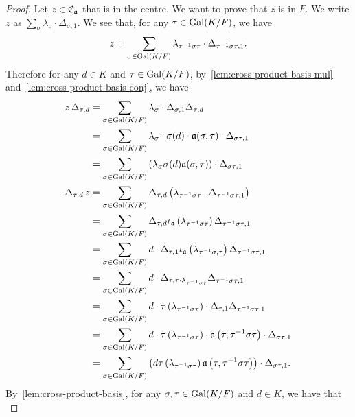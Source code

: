\begin{proof}
  Let $z \in \operatorname{\mathfrak{C}}_{\mathfrak{a}}$ that is in the centre. We want to prove that $z$ is in $F$. We write $z$ as $\sum_{\sigma}\lambda_{\sigma}\cdot\Delta_{\sigma,1}$. We see that, for any $\tau \in \operatorname{Gal}(K/F)$, we have
  \[
    z = \sum_{\sigma\in\operatorname{Gal}(K/F)} \lambda_{\tau^{-1}\sigma\tau}\cdot\Delta_{\tau^{-1}\sigma\tau,1}.
  \]
  Therefore for any $d \in K$ and $\tau\in\operatorname{Gal}(K/F)$, by~\cref{lem:cross-product-basis-mul} and~\cref{lem:cross-product-basis-conj}, we have
  \[
    \begin{aligned}
      z\, \Delta_{\tau,d}
      &= \sum_{\sigma\in\operatorname{Gal}(K/F)}\lambda_{\sigma}\cdot\Delta_{\sigma, 1}\Delta_{\tau,d}\\
      &= \sum_{\sigma\in\operatorname{Gal}(K/F)}\lambda_{\sigma}\cdot\sigma(d)\cdot \mathfrak{a}(\sigma,\tau) \cdot \Delta_{\sigma\tau, 1}\\
      &= \sum_{\sigma\in\operatorname{Gal}(K/F)}\left(\lambda_{\sigma}\sigma(d)\mathfrak{a}(\sigma,\tau)\right)\cdot \Delta_{\sigma\tau,1}\\
      \Delta_{\tau,d}\, z
      &= \sum_{\sigma\in\operatorname{Gal}(K/F)}\Delta_{\tau,d}\left(\lambda_{\tau^{-1}\sigma\tau}\cdot \Delta_{\tau^{-1}\sigma\tau, 1}\right)\\
      &= \sum_{\sigma\in\operatorname{Gal}(K/F)}\Delta_{\tau,d}\iota_{\mathfrak{a}}\left(\lambda_{\tau^{-1}\sigma\tau}\right)\Delta_{\tau^{-1}\sigma\tau, 1} \\
      &=\sum_{\sigma\in\operatorname{Gal}(K/F)} d \cdot \Delta_{\tau, 1}\iota_{\mathfrak{a}}\left(\lambda_{\tau^{-1}\sigma, \tau}\right)\Delta_{\tau^{-1}\sigma\tau, 1}\\
      &=\sum_{\sigma\in\operatorname{Gal}(K/F)} d \cdot \Delta_{\tau, \tau\cdot \lambda_{\tau^{-1}\sigma\tau}}\Delta_{\tau^{-1}\sigma\tau, 1}\\
      &=\sum_{\sigma\in\operatorname{Gal}(K/F)} d\cdot \tau\left(\lambda_{\tau^{-1}\sigma\tau}\right)\cdot \Delta_{\tau,1}\Delta_{\tau^{-1}\sigma\tau, 1}\\
      &= \sum_{\sigma\in\operatorname{Gal}(K/F)}d\cdot \tau\left(\lambda_{\tau^{-1}\sigma\tau}\right)\cdot \mathfrak{a}\left(\tau,\tau^{-1}\sigma\tau\right)\cdot \Delta_{\sigma\tau, 1}\\
      &= \sum_{\sigma\in\operatorname{Gal}(K/F)}\left(d\tau\left(\lambda_{\tau^{-1}\sigma\tau}\right)\mathfrak{a}\left(\tau,\tau^{-1}\sigma\tau\right)\right) \cdot \Delta_{\sigma\tau,1}.
    \end{aligned}
  \]
  By~\cref{lem:cross-product-basis}, for any $\sigma,\tau\in\operatorname{Gal}(K/F)$ and $d\in K$, we have that
  \begin{equation}
    \label{eq:cross-product-central-eqn}

\end{equation}
\end{proof}
